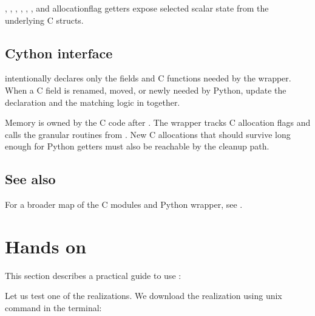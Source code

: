 \documentclass[letterpaper,10pt,english]{sphinxmanual}
\begin{document}
\sphinxAtStartPar
{}, , , , ,
, and allocation\sphinxhyphen{}flag getters expose selected scalar state from
the underlying C structs.


\section{Cython interface}
\label{\detokenize{python:cython-interface}}
\sphinxAtStartPar
{} intentionally declares only the fields and C functions
needed by the wrapper. When a C field is renamed, moved, or newly needed by
Python, update the  declaration and the matching logic in
 together.

\sphinxAtStartPar
Memory is owned by the C code after . The wrapper tracks C
allocation flags and calls the granular  routines from
. New C allocations that should survive long enough for
Python getters must also be reachable by the cleanup path.


\section{See also}
\label{\detokenize{python:see-also}}
\sphinxAtStartPar
For a broader map of the C modules and Python wrapper, see
{\hyperref[\detokenize{code_structure::doc}]{}}.

\sphinxstepscope


\chapter{Hands on}
\label{\detokenize{handson:hands-on}}\label{\detokenize{handson::doc}}
\sphinxAtStartPar
This section describes a practical guide to use :

\sphinxAtStartPar
Let us test one of the  realizations. We download the realization using unix  command in the terminal:

\begin{sphinxVerbatim}[commandchars=\\\{\}]
 
\end{sphinxVerbatim}
\end{document}
